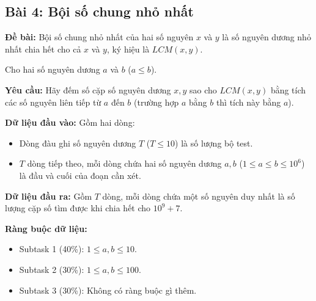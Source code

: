 \documentclass[12pt]{scrartcl}  %
\begin{document}
\subsection{Bài 4: Bội số chung nhỏ nhất}

\textbf{Đề bài:}
Bội số chung nhỏ nhất của hai số nguyên $x$ và $y$ là số nguyên dương nhỏ nhất chia hết cho cả $x$ và $y$, ký hiệu là $LCM(x, y)$.

Cho hai số nguyên dương $a$ và $b$ ($a \leq b$).

\textbf{Yêu cầu:}
Hãy đếm số cặp số nguyên dương $x, y$ sao cho $LCM(x, y)$ bằng tích các số nguyên liên tiếp từ $a$ đến $b$ (trường hợp $a$ bằng $b$ thì tích này bằng $a$).

\textbf{Dữ liệu đầu vào:}
Gồm hai dòng:
\begin{itemize}
    \item Dòng đàu ghi số nguyên dương $T$ ($T \leq 10$) là số lượng bộ test.
    \item $T$ dòng tiếp theo, mỗi dòng chứa hai số nguyên dương $a, b$ ($1 \leq a \leq b \leq 10^6$) là đầu và cuối của đoạn cần xét.
\end{itemize}

\textbf{Dữ liệu đầu ra:}
Gồm $T$ dòng, mỗi dòng chứa một số nguyên duy nhất là số lượng cặp số tìm được khi chia hết cho $10^9 + 7$.

\textbf{Ràng buộc dữ liệu:}
\begin{itemize}
    \item Subtask 1 (40\%): $1 \leq a, b \leq 10$.
    \item Subtask 2 (30\%): $1 \leq a, b \leq 100$.
    \item Subtask 3 (30\%): Không có ràng buộc gì thêm.
\end{itemize}
\end{document}
